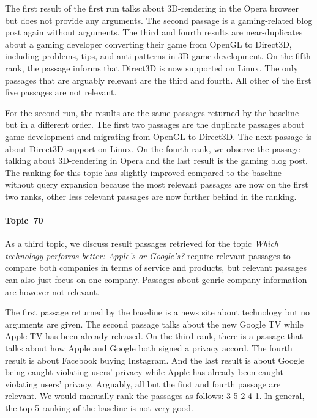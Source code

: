 The first result of the first run talks about 3D-rendering in the Opera browser but does not provide any arguments.
The second passage is a gaming-related blog post again without arguments.
The third and fourth results are near-duplicates about a gaming developer converting their game from OpenGL to Direct3D, including problems, tips, and anti-patterns in 3D game development.
On the fifth rank, the passage informs that Direct3D is now supported on Linux.
The only passages that are arguably relevant are the third and fourth.
All other of the first five passages are not relevant.

For the second run, the results are the same passages returned by the baseline but in a different order.
The first two passages are the duplicate passages about game development and migrating from OpenGL to Direct3D.
The next passage is about Direct3D support on Linux.
On the fourth rank, we observe the passage talking about 3D-rendering in Opera and the last result is the gaming blog post.
The ranking for this topic has slightly improved compared to the baseline without query expansion because the most relevant passages are now on the first two ranks, other less relevant passages are now further behind in the ranking.

\paragraph{Topic~70}

As a third topic, we discuss result passages retrieved for the topic
\textit{Which technology performs better: Apple's or Google's?}
\citet{BondarenkoFKSGBPBSWPH2022} require relevant passages to compare both companies in terms of service and products, but relevant passages can also just focus on one company.
Passages about genric company information are however not relevant.

The first passage returned by the baseline is a news site about technology but no arguments are given.
The second passage talks about the new Google TV while Apple TV has been already released.
On the third rank, there is a passage that talks about how Apple and Google both signed a privacy accord.
The fourth result is about Facebook buying Instagram.
And the last result is about Google being caught violating users' privacy while Apple has already been caught violating users' privacy.
Arguably, all but the first and fourth passage are relevant.
We would manually rank the passages as follows: 3-5-2-4-1.
In general, the top-5 ranking of the baseline is not very good.

